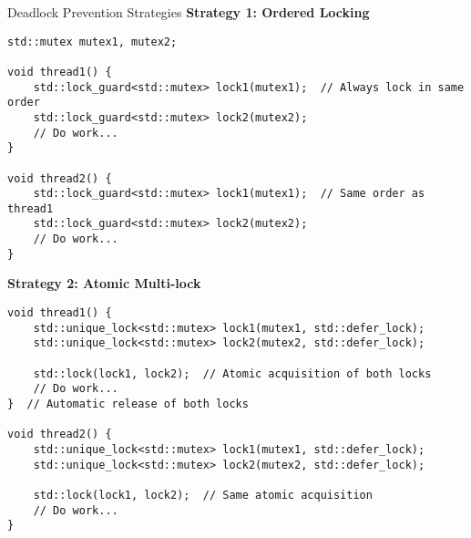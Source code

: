 \begin{frame}[fragile]{ Deadlock Prevention Strategies}
	\textbf{Strategy 1: Ordered Locking}
	\begin{verbatim}
std::mutex mutex1, mutex2;

void thread1() {
    std::lock_guard<std::mutex> lock1(mutex1);  // Always lock in same order
    std::lock_guard<std::mutex> lock2(mutex2);
    // Do work...
}

void thread2() {
    std::lock_guard<std::mutex> lock1(mutex1);  // Same order as thread1
    std::lock_guard<std::mutex> lock2(mutex2);
    // Do work...
}
	\end{verbatim}

	\textbf{Strategy 2: Atomic Multi-lock}
	\begin{verbatim}
void thread1() {
    std::unique_lock<std::mutex> lock1(mutex1, std::defer_lock);
    std::unique_lock<std::mutex> lock2(mutex2, std::defer_lock);

    std::lock(lock1, lock2);  // Atomic acquisition of both locks
    // Do work...
}  // Automatic release of both locks

void thread2() {
    std::unique_lock<std::mutex> lock1(mutex1, std::defer_lock);
    std::unique_lock<std::mutex> lock2(mutex2, std::defer_lock);

    std::lock(lock1, lock2);  // Same atomic acquisition
    // Do work...
}
	\end{verbatim}
\end{frame}

